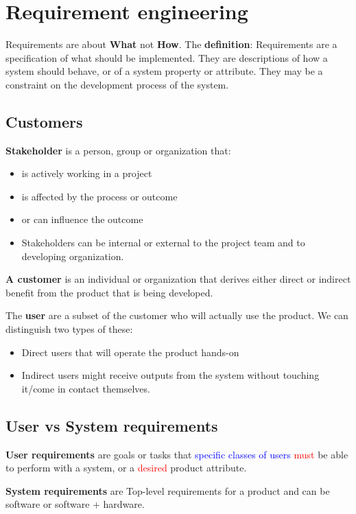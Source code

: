 
\section{Requirement engineering}
Requirements are about \textbf{What} not \textbf{How}. The \textbf{definition}: Requirements are a specification of what should be implemented. They are descriptions of how a system should behave, or of a system property or attribute. They may be a constraint on the development process of the system. 

\subsection{Customers}
\textbf{Stakeholder} is a person, group or organization that: 
\begin{itemize}
	\item is actively  working in a project
	\item is affected by the process or outcome
	\item or can influence the outcome
	\item Stakeholders can be internal or external to the project team and to developing organization.
\end{itemize}

\textbf{A customer} is an individual or organization that derives either direct or indirect benefit from the product that is being developed. 

The \textbf{user} are a subset of the customer who will actually use the product. We can distinguish two types of these:
\begin{itemize}
	\item Direct users that will operate the product hands-on
	\item Indirect users might receive outputs from the system without touching it/come in contact themselves.
\end{itemize}

\subsection{User vs System requirements}
\textbf{User requirements }are goals or tasks that \textcolor{blue}{specific classes of users} \textcolor{red}{must} be able to perform with a system, or a \textcolor{red}{desired} product attribute. 

\textbf{System requirements} are Top-level requirements for a product and can be software or software + hardware.


